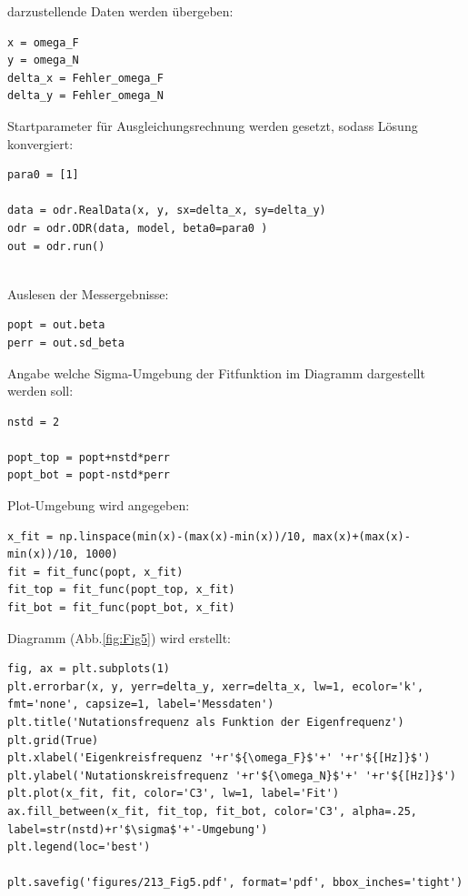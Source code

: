 \documentclass[a4paper,10pt]{article}
\begin{document}
darzustellende Daten werden übergeben:\begin{lstlisting}
x = omega_F
y = omega_N
delta_x = Fehler_omega_F
delta_y = Fehler_omega_N

\end{lstlisting}

Startparameter für Ausgleichungsrechnung werden gesetzt, sodass Lösung konvergiert:\begin{lstlisting}
para0 = [1]

data = odr.RealData(x, y, sx=delta_x, sy=delta_y)
odr = odr.ODR(data, model, beta0=para0 )
out = odr.run()


\end{lstlisting}

Auslesen der Messergebnisse:\begin{lstlisting}
popt = out.beta
perr = out.sd_beta

\end{lstlisting}

Angabe welche Sigma-Umgebung der Fitfunktion im Diagramm dargestellt werden soll:\begin{lstlisting}
nstd = 2

popt_top = popt+nstd*perr
popt_bot = popt-nstd*perr

\end{lstlisting}

Plot-Umgebung wird angegeben:\begin{lstlisting}
x_fit = np.linspace(min(x)-(max(x)-min(x))/10, max(x)+(max(x)-min(x))/10, 1000)
fit = fit_func(popt, x_fit)
fit_top = fit_func(popt_top, x_fit)
fit_bot = fit_func(popt_bot, x_fit)

\end{lstlisting}

Diagramm (Abb.\ref{fig:Fig5}) wird erstellt:\begin{lstlisting}
fig, ax = plt.subplots(1)
plt.errorbar(x, y, yerr=delta_y, xerr=delta_x, lw=1, ecolor='k', fmt='none', capsize=1, label='Messdaten')
plt.title('Nutationsfrequenz als Funktion der Eigenfrequenz')
plt.grid(True)
plt.xlabel('Eigenkreisfrequenz '+r'${\omega_F}$'+' '+r'${[Hz]}$')
plt.ylabel('Nutationskreisfrequenz '+r'${\omega_N}$'+' '+r'${[Hz]}$')
plt.plot(x_fit, fit, color='C3', lw=1, label='Fit')
ax.fill_between(x_fit, fit_top, fit_bot, color='C3', alpha=.25, label=str(nstd)+r'$\sigma$'+'-Umgebung')
plt.legend(loc='best')

plt.savefig('figures/213_Fig5.pdf', format='pdf', bbox_inches='tight')

\end{lstlisting}
\end{document}
